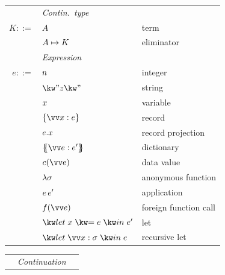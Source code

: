 \begin{figure}
   \begin{minipage}[t]{0.48\textwidth}
      \begin{tabularx}{\textwidth}{rL{2.2cm}L{3.6cm}}
         &\textit{Contin.~type}&
         \\
         $K ::=$
         &
         $A$
         &
         term
         \\
         &
         ${A}\mapsto{K}$
         &
         eliminator
         \\[2mm]
         &\textit{Expression}&
         \\
         $e ::=$
         &
         $n$
         &
         integer
         \\
         &
         $\exStr{z}$
         &
         string
         \\
         &
         $x$
         &
         variable
         \\
         &
         $\exRec{\seq{\bind{x}{e}}}$
         &
         record
         \\
         &
         $e.x$
         &
         record projection
         \\
         &
         $\exDict{\seq{\bind{e}{e}}'}$
         &
         dictionary
         \\
         &
         $\exConstr{c}{\seq{e}}$
         &
         data value
         \\
         &
         $\lambda{\sigma}$
         &
         anonymous function
         \\
         &
         ${e}\,{e'}$
         &
         application
         \\
         &
         $\exForeignApp{f}{\seq{e}}$
         &
         foreign function call
         \\
         &
         $\exLet{x}{e}{e'}$
         &
         let
         \\
         &
         $\exLetRec{\seq{\bind{x}{\sigma}}}{e}$
         &
         recursive let
         \\[3mm]
      \end{tabularx}
   \end{minipage}%
   \begin{minipage}[t]{0.48\textwidth}
      \begin{tabularx}{\textwidth}{rL{2.7cm}L{3cm}}
         &\textit{Continuation}&
         \\

\end{tabularx}
\end{minipage}
\end{figure}
